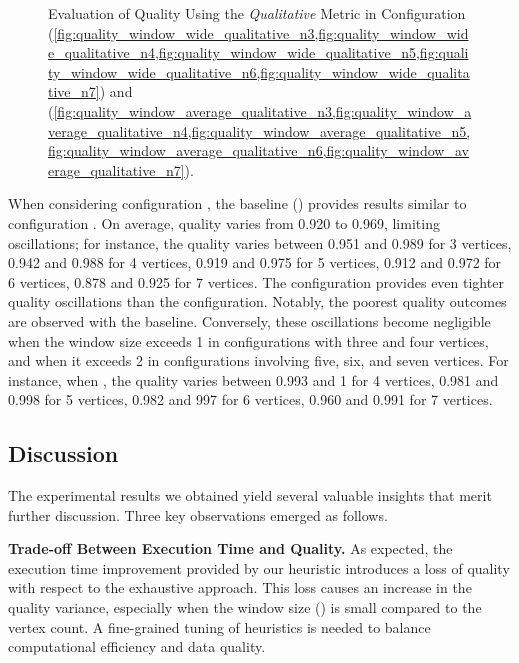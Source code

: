 \begin{figure}[H]
\begin{adjustbox}{minipage=\linewidth,scale=0.75}
    \caption{Evaluation of Quality Using the \emph{Qualitative} Metric in Configuration \wide (\cref{fig:quality_window_wide_qualitative_n3,fig:quality_window_wide_qualitative_n4,fig:quality_window_wide_qualitative_n5,fig:quality_window_wide_qualitative_n6,fig:quality_window_wide_qualitative_n7}) and \average (\cref{fig:quality_window_average_qualitative_n3,fig:quality_window_average_qualitative_n4,fig:quality_window_average_qualitative_n5,fig:quality_window_average_qualitative_n6,fig:quality_window_average_qualitative_n7}).}  \label{fig:quality_window_qualitative}
  \end{adjustbox}
\end{figure}

When considering configuration \average, the baseline () provides results similar to configuration \wide. On average, quality varies from 0.920 to 0.969, limiting oscillations; for instance, the quality varies between 0.951 and 0.989 for 3 vertices, 0.942 and 0.988 for 4 vertices, 0.919 and 0.975 for 5 vertices, 0.912 and 0.972 for 6 vertices, 0.878 and 0.925 for 7 vertices. The \average configuration provides even tighter quality oscillations than the \wide configuration. Notably, the poorest quality outcomes are observed with the baseline. Conversely, these oscillations become negligible when the window size exceeds 1 in configurations with three and four vertices, and when it exceeds 2 in configurations involving five, six, and seven vertices.  For instance, when , the quality varies between  0.993 and 1 for 4 vertices, 0.981 and 0.998 for 5 vertices, 0.982 and 997 for 6 vertices, 0.960 and 0.991 for 7 vertices.


\subsection{Discussion}
The experimental results we obtained yield several valuable insights that merit further discussion. Three key observations emerged as follows.

\vspace{0.5em}

\noindent\textbf{Trade-off Between Execution Time and Quality.} As expected, the execution time improvement provided by our heuristic introduces a loss of quality with respect to the exhaustive approach. This loss causes an increase in the quality variance, especially when the window size (\windowsize) is small compared to the vertex count. A fine-grained tuning of heuristics is needed to balance computational efficiency and data quality.

